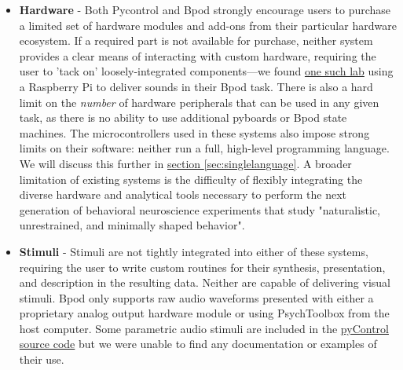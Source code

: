 \begin{itemize}[after=\vspace{-\topsep}]
    \item \textbf{Hardware} - Both Pycontrol and Bpod strongly encourage users to purchase a limited set of hardware modules and add-ons from their particular hardware ecosystem. If a required part is not available for purchase, neither system provides a clear means of interacting with custom hardware, requiring the user to 'tack on' loosely-integrated components---we found \href{https://github.com/erlichlab/BpodSoundModule}{one such lab} using a Raspberry Pi to deliver sounds in their Bpod task.   There is also a hard limit on the \textit{number} of hardware peripherals that can be used in any given task, as there is no ability to use additional pyboards or Bpod state machines. The microcontrollers used in these systems also impose strong limits on their software: neither run a full, high-level programming language. We will discuss this further in \hyperref[sec:singlelanguage]{section \ref*{sec:singlelanguage}}. A broader  limitation of existing systems is the difficulty of flexibly integrating the diverse hardware and analytical tools necessary to perform the next generation of behavioral neuroscience experiments that study "naturalistic, unrestrained, and minimally shaped behavior"\citep{dattaComputationalNeuroethologyCall2019}.
    \item \textbf{Stimuli} - Stimuli are not tightly integrated into either of these systems, requiring the user to write custom routines for their synthesis, presentation, and description in the resulting data. Neither are capable of delivering visual stimuli. Bpod only supports raw audio waveforms presented with either a proprietary analog output hardware module or using PsychToolbox from the host computer. Some parametric audio stimuli are included in the \href{https://bitbucket.org/takam/pycontrol/src/default/pyControl/audio.py}{pyControl source code} but we were unable to find any documentation or examples of their use. %
\end{itemize}\nobreak%
